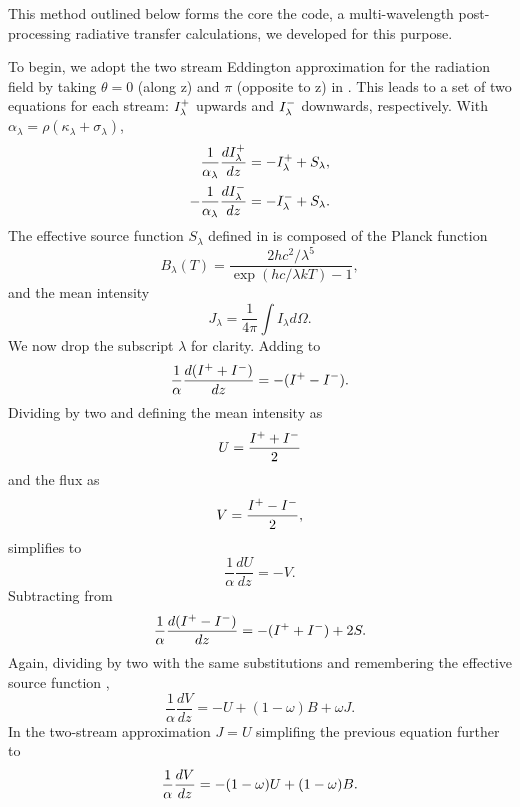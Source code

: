 This method outlined below forms the core the \ocotillo code, a multi-wavelength post-processing radiative transfer calculations, we developed for this purpose.

\label{sec:Feautrier-method}

To begin, we adopt the two stream Eddington approximation for the radiation field by taking $\theta = 0$ (along z) and $\pi$ (opposite to z) in .
This leads to a set of two equations for each stream: $I^+_\lambda$ upwards and $I^-_\lambda$ downwards, respectively.
With $\alpha_\lambda = \rho(\kappa_\lambda + \sigma_\lambda)$,
\begin{align} 
    \frac{1}{\alpha_\lambda}\frac{dI^+_\lambda}{dz} &= -I^+_\lambda + S_\lambda \label{eqn:dIpdz}, \\
    -\frac{1}{\alpha_\lambda}\frac{dI^-_\lambda}{dz} &= -I^-_\lambda + S_\lambda. \label{eqn:dImdz}
\end{align}
The effective source function $S_\lambda$ defined in  is composed of the Planck function
\begin{equation}
    B_{\lambda}(T) = \frac{2hc^2/\lambda^5}{\exp(hc/\lambda k T) - 1},
\end{equation}
and the mean intensity
\begin{equation}
    J_\lambda = \frac{1}{4\pi}\int I_\lambda d\Omega.
\end{equation}
We now drop the subscript $\lambda$ for clarity.
Adding  to 
\begin{equation}\label{eqn:dIdz}
    \frac{1}{\alpha}\frac{d(I^+ + I^-)}{dz} = - (I^+ - I^-).
\end{equation}
Dividing by two and defining the mean intensity as 
\begin{equation}
    U = \frac{I^+ + I^-}{2}
\end{equation}
and the flux as
\begin{equation}
    V = \frac{I^+ - I^-}{2},
\end{equation}
 simplifies to
\begin{equation}\label{eqn:dUdz=-V}
    \frac{1}{\alpha}\frac{dU}{dz} = -V.
\end{equation}
Subtracting  from 
\begin{equation}
    \frac{1}{\alpha}\frac{d(I^+ - I^-)}{dz} = - (I^+ + I^-) + 2S.
\end{equation}
Again, dividing by two with the same substitutions and remembering the effective source function ,
\begin{equation}
    \frac{1}{\alpha}\frac{dV}{dz} = -U + (1-\omega) B + \omega J.
\end{equation}
In the two-stream approximation $J=U$ simplifing the previous equation further to
\begin{equation}
    \frac{1}{\alpha}\frac{dV}{dz} = -(1-\omega) U + (1-\omega) B. \\
\end{equation}

